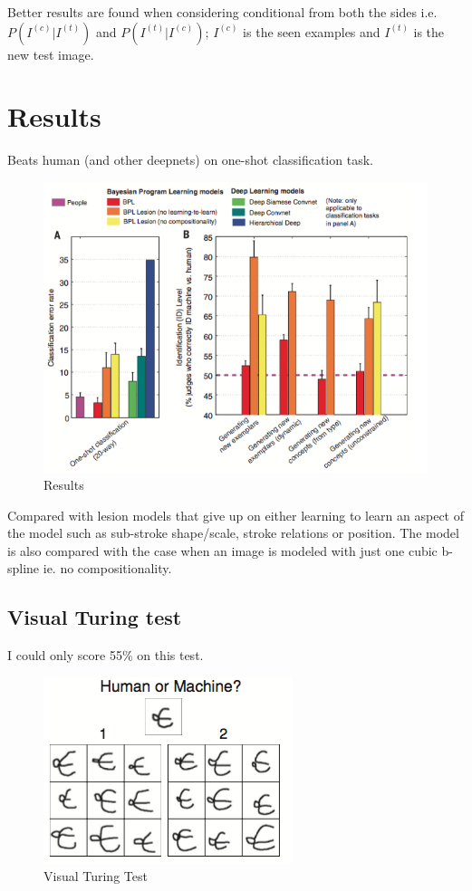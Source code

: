\documentclass[11pt]{article}
\begin{document}
Better results are found when considering conditional from both the sides i.e. $P(I^{(c)}|I^{(t)})$ and $P(I^{(t)}|I^{(c)})$;
$I^{(c)}$ is the seen examples and $I^{(t)}$ is the new test image.

\section{Results}
\label{sec-11}
Beats human (and other deepnets) on one-shot classification task.
\begin{figure}[htb]
\centering
\includegraphics[width=.9\linewidth]{./md_slides/_images/bpl_results.png}
\caption{Results}
\end{figure}

Compared with lesion models that give up on either learning to learn an aspect of the model such as sub-stroke shape/scale, stroke relations or position.
The model is also compared with the case when an image is modeled with just one cubic b-spline ie. no compositionality.
\subsection{Visual Turing test}
\label{sec-11-1}
I could only score 55\% on this test.
\begin{figure}[htb]
\centering
\includegraphics[width=.9\linewidth]{./md_slides/_images/vturing.png}
\caption{Visual Turing Test}
\end{figure}
\end{document}
